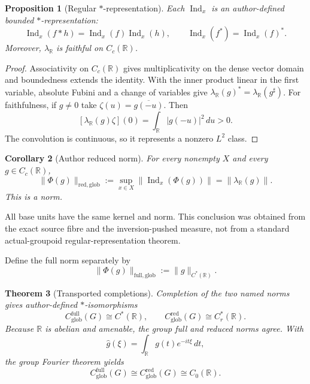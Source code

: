 \documentclass[11pt]{article}
\newtheorem{theorem}{Theorem}[section]
\newtheorem{proposition}[theorem]{Proposition}
\newtheorem{corollary}[theorem]{Corollary}
\theoremstyle{definition}
\newcommand{\R}{\mathbb R}
\newcommand{\Cfull}{C_{\mathrm{glob}}^{\mathrm{full}}}
\newcommand{\Cred}{C_{\mathrm{glob}}^{\mathrm{red}}}
\newcommand{\Ind}{\operatorname{Ind}}
\begin{document}
\begin{proposition}[Regular $*$-representation]
\label{prop:regular-star}
Each $\Ind_x$ is an author-defined bounded $*$-representation:
\[
 \Ind_x(f*h)=\Ind_x(f)\Ind_x(h),\qquad
 \Ind_x(f^*)=\Ind_x(f)^*.
\]
Moreover, $\lambda_{\R}$ is faithful on $C_c(\R)$.
\end{proposition}

\begin{proof}
Associativity on $C_c(\R)$ gives multiplicativity on the dense vector domain
and boundedness extends the identity.  With the inner product linear in the
first variable, absolute Fubini and a change of variables give
$\lambda_{\R}(g)^*=\lambda_{\R}(g^{\sharp})$.  For faithfulness, if $g\ne0$ take
$\zeta(u)=\overline{g(-u)}$.  Then
\[
 [\lambda_{\R}(g)\zeta](0)=\int_{\R}|g(-u)|^2\,du>0.
\]
The convolution is continuous, so it represents a nonzero $L^2$ class.
\end{proof}

\begin{corollary}[Author reduced norm]
\label{cor:reduced}
For every nonempty $X$ and every $g\in C_c(\R)$,
\begin{equation}
 \|\Phi(g)\|_{\mathrm{red,glob}}
 :=\sup_{x\in X}\|\Ind_x(\Phi(g))\|
 =\|\lambda_{\R}(g)\|.
 \label{eq:rednorm}
\end{equation}
This is a norm.
\end{corollary}

All base units have the same kernel and norm.  This conclusion was obtained
from the exact source fibre and the inversion-pushed measure, not from a
standard actual-groupoid regular-representation theorem.

Define the full norm separately by
\begin{equation}
 \|\Phi(g)\|_{\mathrm{full,glob}}:=\|g\|_{C^*(\R)}.
 \label{eq:fullnorm}
\end{equation}

\begin{theorem}[Transported completions]
\label{thm:completions}
Completion of the two named norms gives author-defined $*$-isomorphisms
\begin{equation}
 \Cfull(G)\cong C^*(\R),\qquad
 \Cred(G)\cong C_r^*(\R).
 \label{eq:transport}
\end{equation}
Because $\R$ is abelian and amenable, the group full and reduced norms agree.
With
\[
 \widehat g(\xi)=\int_{\R} g(t)e^{-it\xi}\,dt,
\]
the group Fourier theorem yields
\begin{equation}
 \Cfull(G)\cong\Cred(G)\cong C_0(\R).
 \label{eq:Fourier-model}
\end{equation}
\end{theorem}
\end{document}
